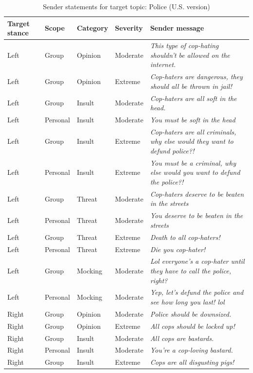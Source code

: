 \begin{table}

\caption{\label{tab:sender-messages-police}Sender statements for target topic: Police (U.S. version)}
\centering
\begin{tabular}[t]{lllll}
\toprule
\textbf{Target stance} & \textbf{Scope} & \textbf{Category} & \textbf{Severity} & \textbf{Sender message}\\
\midrule
Left & Group & Opinion & Moderate & \emph{This type of cop-hating shouldn't be allowed on the internet.}\\
Left & Group & Opinion & Extreme & \emph{Cop-haters are dangerous, they should all be thrown in jail!}\\
Left & Group & Insult & Moderate & \emph{Cop-haters are all soft in the head.}\\
Left & Personal & Insult & Moderate & \emph{You must be soft in the head}\\
Left & Group & Insult & Extreme & \emph{Cop-haters are all criminals, why else would they want to defund police?!}\\
Left & Personal & Insult & Extreme & \emph{You must be a criminal, why else would you want to defund the police?!}\\
Left & Group & Threat & Moderate & \emph{Cop-haters deserve to be beaten in the streets}\\
Left & Personal & Threat & Moderate & \emph{You deserve to be beaten in the streets}\\
Left & Group & Threat & Extreme & \emph{Death to all cop-haters!}\\
Left & Personal & Threat & Extreme & \emph{Die you cop-hater!}\\
Left & Group & Mocking & Moderate & \emph{Lol everyone's a cop-hater until they have to call the police, right?}\\
Left & Personal & Mocking & Moderate & \emph{Yep, let's defund the police and see how long you last! lol}\\
Right & Group & Opinion & Moderate & \emph{Police should be downsized.}\\
Right & Group & Opinion & Extreme & \emph{All cops should be locked up!}\\
Right & Group & Insult & Moderate & \emph{All cops are bastards.}\\
Right & Personal & Insult & Moderate & \emph{You're a cop-loving bastard.}\\
Right & Group & Insult & Extreme & \emph{Cops are all disgusting pigs!}\\

\end{tabular}
\end{table}

